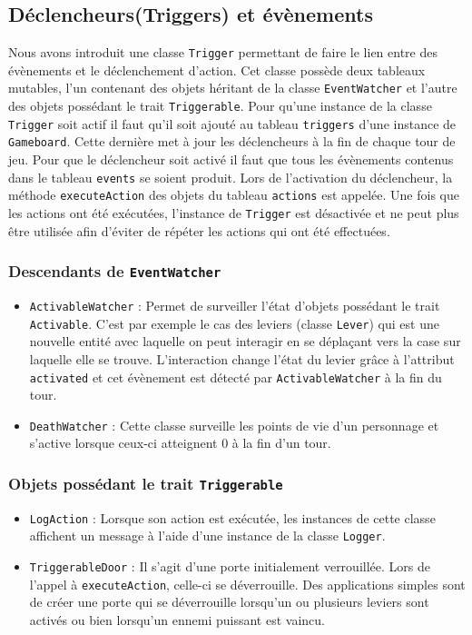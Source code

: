 \documentclass[10pt,a4paper]{article}
\begin{document}
\subsection{Déclencheurs(Triggers) et évènements}
Nous avons introduit une classe \texttt{Trigger} permettant de faire le lien entre des évènements et le déclenchement d'action. Cet classe possède deux tableaux mutables, l'un contenant des objets héritant de la classe \texttt{EventWatcher} et l'autre des objets possédant le trait \texttt{Triggerable}. Pour qu'une instance de la classe \texttt{Trigger} soit actif il faut qu'il soit ajouté au tableau \texttt{triggers} d'une instance de \texttt{Gameboard}. Cette dernière met à jour les déclencheurs à la fin de chaque tour de jeu. Pour que le déclencheur soit activé il faut que tous les évènements contenus dans le tableau \texttt{events} se soient produit. Lors de l'activation du déclencheur, la méthode \texttt{executeAction} des objets du tableau \texttt{actions} est appelée. Une fois que les actions ont été exécutées, l'instance de \texttt{Trigger} est désactivée et ne peut plus être utilisée afin d'éviter de répéter les actions qui ont été effectuées.

\subsubsection{Descendants de \texttt{EventWatcher}}
\begin{itemize}
	\item \texttt{ActivableWatcher} : Permet de surveiller l'état d'objets possédant le trait \texttt{Activable}. C'est par exemple le cas des leviers (classe \texttt{Lever}) qui est une nouvelle entité avec laquelle on peut interagir en se déplaçant vers la case sur laquelle elle se trouve. L'interaction change l'état du levier grâce à l'attribut \texttt{activated} et cet évènement est détecté par \texttt{ActivableWatcher} à la fin du tour.
	\item \texttt{DeathWatcher} : Cette classe surveille les points de vie d'un personnage et s'active lorsque ceux-ci atteignent 0 à la fin d'un tour.
\end{itemize}

\subsubsection{Objets possédant le trait \texttt{Triggerable}}
\begin{itemize}
	\item \texttt{LogAction} : Lorsque son action est exécutée, les instances de cette classe affichent un message à l'aide d'une instance de la classe \texttt{Logger}.
	\item \texttt{TriggerableDoor} : Il s'agit d'une porte initialement verrouillée. Lors de l'appel à \texttt{executeAction}, celle-ci se déverrouille. Des applications simples sont de créer une porte qui se déverrouille lorsqu'un ou plusieurs leviers sont activés ou bien lorsqu'un ennemi puissant est vaincu.
\end{itemize}
\end{document}
